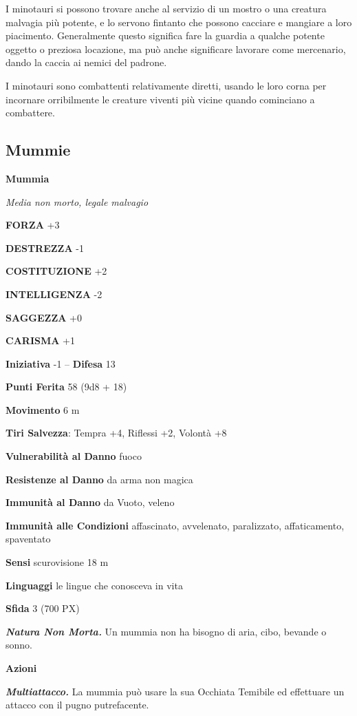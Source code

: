 \begin{multicols}{2}
I minotauri si possono trovare anche al servizio di un mostro o una creatura malvagia più potente, e lo servono fintanto che possono cacciare e mangiare a loro piacimento. Generalmente questo significa fare la guardia a qualche potente oggetto o preziosa locazione, ma può anche significare lavorare come mercenario, dando la caccia ai nemici del padrone.

I minotauri sono combattenti relativamente diretti, usando le loro corna per incornare orribilmente le creature viventi più vicine quando cominciano a combattere.


\subsection{Mummie}

\medskip{}\textbf{Mummia}

\textit{Media non morto, legale malvagio}

\textbf{FORZA} +3

\textbf{DESTREZZA} -1

\textbf{COSTITUZIONE} +2

\textbf{INTELLIGENZA} -2

\textbf{SAGGEZZA} +0

\textbf{CARISMA} +1

\textbf{Iniziativa} -1 -- \textbf{Difesa} 13

\textbf{Punti Ferita} 58 (9d8 + 18)

\textbf{Movimento} 6 m

\textbf{Tiri Salvezza}: Tempra +4, Riflessi +2, Volontà +8

\textbf{Vulnerabilità al Danno} fuoco

\textbf{Resistenze al Danno} da arma non magica

\textbf{Immunità al Danno} da Vuoto, veleno

\textbf{Immunità alle Condizioni} affascinato, avvelenato, paralizzato, affaticamento, spaventato

\textbf{Sensi} scurovisione 18 m

\textbf{Linguaggi} le lingue che conosceva in vita

\textbf{Sfida} 3 (700 PX)

\textit{\textbf{Natura Non Morta.}} Un mummia non ha bisogno di aria, cibo, bevande o sonno.

\textbf{Azioni}

\textit{\textbf{Multiattacco.}} La mummia può usare la sua Occhiata Temibile ed effettuare un attacco con il pugno putrefacente.


\end{multicols}
